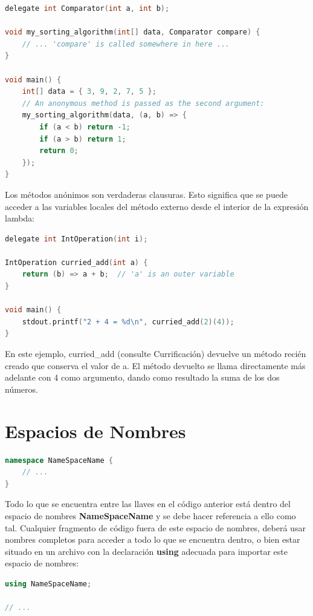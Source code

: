 \documentclass[12pt,twoside]{book}
\begin{document}
\begin{lstlisting}[language=C++]
delegate int Comparator(int a, int b);

void my_sorting_algorithm(int[] data, Comparator compare) {
	// ... 'compare' is called somewhere in here ...
}

void main() {
	int[] data = { 3, 9, 2, 7, 5 };
	// An anonymous method is passed as the second argument:
	my_sorting_algorithm(data, (a, b) => {
		if (a < b) return -1;
		if (a > b) return 1;
		return 0;
	});
}
\end{lstlisting}

Los métodos anónimos son verdaderas clausuras. Esto significa que se puede acceder a las variables locales del método externo desde el interior de la expresión lambda:

\begin{lstlisting}[language=C++]
delegate int IntOperation(int i);

IntOperation curried_add(int a) {
	return (b) => a + b;  // 'a' is an outer variable
}

void main() {
	stdout.printf("2 + 4 = %d\n", curried_add(2)(4));
}
\end{lstlisting}

En este ejemplo, curried\_add (consulte Currificación) devuelve un método recién creado que conserva el valor de a. El método devuelto se llama directamente más adelante con 4 como argumento, dando como resultado la suma de los dos números.


\section{Espacios de Nombres}

\begin{lstlisting}[language=C++]
namespace NameSpaceName {
	// ...
}
\end{lstlisting}

Todo lo que se encuentra entre las llaves en el código anterior está dentro del espacio de nombres \textbf{NameSpaceName} y se debe hacer referencia a ello como tal. Cualquier fragmento de código fuera de este espacio de nombres, deberá usar nombres completos para acceder a todo lo que se encuentra dentro, o bien estar situado en un archivo con la declaración \textbf{using} adecuada para importar este espacio de nombres:

\begin{lstlisting}[language=C++]
using NameSpaceName;

// ...
\end{lstlisting}
\end{document}
